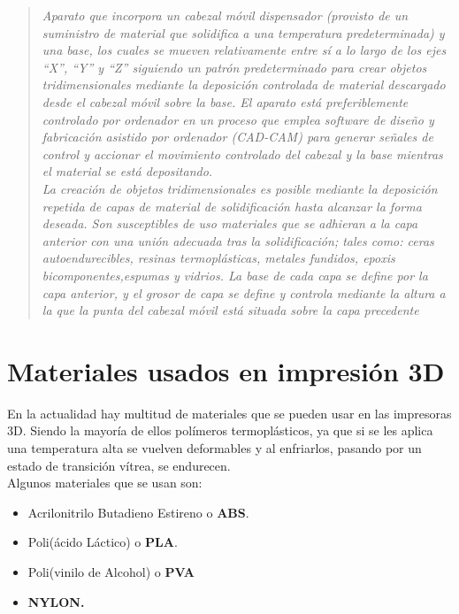 \begin{quotation}
    \emph{
    Aparato que incorpora un cabezal móvil dispensador (provisto de un suministro de material que solidifica a una temperatura predeterminada) y una base, los cuales se mueven relativamente entre sí a lo largo de los ejes “X”, “Y” y “Z” siguiendo un patrón predeterminado para crear objetos tridimensionales mediante la deposición controlada de material descargado desde el cabezal móvil sobre la base. El aparato está preferiblemente controlado por ordenador en un proceso que emplea software de diseño y fabricación asistido por ordenador (CAD-CAM) para generar señales de control y accionar el movimiento controlado del cabezal y la base mientras el material se está depositando.}\\

    \emph{La creación de objetos tridimensionales es posible mediante la deposición repetida de  capas de material de solidificación hasta alcanzar la forma deseada. Son susceptibles de uso materiales que se adhieran a la capa anterior con una unión adecuada tras la solidificación; tales como: ceras autoendurecibles, resinas termoplásticas, metales fundidos, epoxis bicomponentes,espumas y vidrios. La base de cada capa se define por la capa anterior, y el grosor de capa se define y controla mediante la altura a la que la punta del cabezal móvil está situada sobre la capa precedente}

\end{quotation}


\section{Materiales usados en impresión 3D}
\label{sec:materiales}

En la actualidad hay multitud de materiales que se pueden usar en las impresoras 3D. Siendo la mayoría de ellos polímeros termoplásticos, ya que si se les aplica una temperatura alta se vuelven deformables y al enfriarlos, pasando por un estado de transición vítrea, se endurecen.\\

Algunos materiales que se usan son:
\begin{itemize}
    \item Acrilonitrilo Butadieno Estireno o \textbf{ABS}.
    \item Poli(ácido Láctico) o \textbf{PLA}.
    \item Poli(vinilo de Alcohol) o \textbf{PVA} 
    \item \textbf{NYLON.}
\end{itemize}


